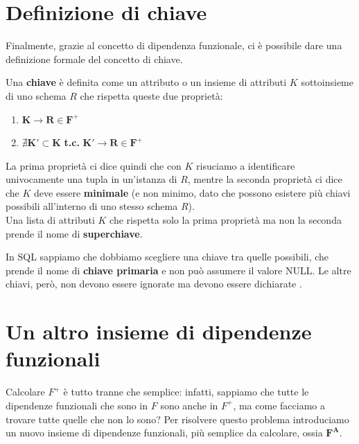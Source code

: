 \documentclass[11pt, a4paper, titlepage, oneside]{scrbook}
\begin{document}
\section{Definizione di chiave}

Finalmente, grazie al concetto di dipendenza funzionale, ci è possibile dare una definizione formale del concetto di chiave. 
\begin{Definizione}[Chiave]
\label{def-chiave-finale}
Una \textbf{chiave} è definita come un attributo o un insieme di attributi $K$ sottoinsieme di uno schema $R$ che rispetta queste due proprietà:
\begin{enumerate}
    \item $\bm{K \longrightarrow R \in F^+}$
    \item $\bm{\nexists K' \subset K}$ \textbf{t.c.} $\bm{K' \longrightarrow R \in F^+}$
\end{enumerate}
\end{Definizione}

La prima proprietà ci dice quindi che con $K$ risuciamo a identificare univocamente una tupla in un'istanza di $R$, mentre la seconda proprietà ci dice che $K$ deve essere \textbf{minimale} (e non minimo, dato che possono esistere più chiavi possibili all'interno di uno stesso schema $R$). \\
Una lista di attributi $K$ che rispetta solo la prima proprietà ma non la seconda prende il nome di \textbf{superchiave}.

\NB In SQL sappiamo che dobbiamo scegliere una chiave tra quelle possibili, che prende il nome di \textbf{chiave primaria} e non può assumere il valore NULL. Le altre chiavi, però, non devono essere ignorate ma devono essere dichiarate .

\section{Un altro insieme di dipendenze funzionali}

Calcolare $F^+$ è tutto tranne che semplice: infatti, sappiamo che tutte le dipendenze funzionali che sono in $F$ sono anche in $F^+$, ma come facciamo a trovare tutte quelle che non lo sono? Per risolvere questo problema introduciamo un nuovo insieme di dipendenze funzionali, più semplice da calcolare, ossia $\bm{F^A}$.
\end{document}

